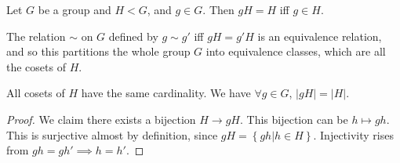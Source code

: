 \begin{corollary}
  Let $G$ be a group and $H< G$, and $g\in G$. Then $gH=H$ iff $g\in H$.
\end{corollary}

\begin{corollary}
  The relation $\sim$ on $G$ defined by $g\sim g'$ iff $gH=g'H$ is an equivalence
  relation, and so this partitions the whole group $G$ into equivalence classes, which
  are all the cosets of $H$.
  \label{leftCosetsEqRel}
\end{corollary}


\begin{theorem}
  All cosets of $H$ have the same cardinality. We have $\forall g\in G$, $|gH|=|H|$.
  \label{cosetsCardinality}
\end{theorem}
\begin{proof}
  We claim there exists a bijection $H\to gH$. This bijection can be $h\mapsto gh$.
  This is surjective almost by definition, since $gH=\left\{ gh | h\in H \right\}$.
  Injectivity rises from $gh=gh'\implies h=h'$.
\end{proof}
